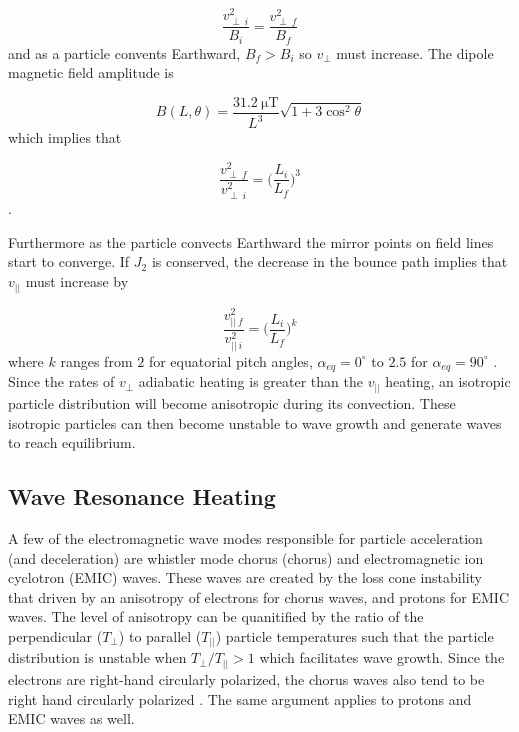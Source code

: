 \begin{equation}
\frac{v^2_{\perp \ i}}{B_i} = \frac{v^2_{\perp \ f}}{B_f}
\end{equation} and as a particle convents Earthward, $B_f > B_i$ so $v_\perp$ must increase. The dipole magnetic field amplitude is 

\begin{equation}
B(L, \theta) = \frac{31.2 \ \mathrm{\mu T}}{L^3}\sqrt{1 + 3 \cos^2 \theta}
\end{equation} which implies that 

\begin{equation}
\frac{v_{\perp \ f}^2}{v_{\perp \ i}^2} = \bigg( \frac{L_i}{L_f} \bigg)^3
\end{equation}.

Furthermore as the particle convects Earthward the mirror points on field lines start to converge. If $J_2$ is conserved, the decrease in the bounce path implies that $v_{||}$ must increase by 

\begin{equation}
\frac{v_{|| \ f}^2}{v_{|| \ i}^2} = \bigg( \frac{L_i}{L_f} \bigg)^k
\end{equation} where $k$ ranges from $2$ for equatorial pitch angles, $\alpha_{eq} = 0^\circ$ to $2.5$ for $\alpha_{eq} = 90^\circ$ \citep{Baumjohann1997}. Since the rates of $v_\perp$ adiabatic heating is greater than the $v_{||}$ heating, an isotropic particle distribution will become anisotropic during its convection. These isotropic particles can then become unstable to wave growth and generate waves to reach equilibrium.


\subsection{Wave Resonance Heating}\label{Intro:wave_heating}
A few of the electromagnetic wave modes responsible for particle acceleration (and deceleration) are whistler mode chorus (chorus) and electromagnetic ion cyclotron (EMIC) waves. These waves are created by the loss cone instability that driven by an anisotropy of electrons for chorus waves, and protons for EMIC waves. The level of anisotropy can be quanitified by the ratio of the perpendicular ($T_\perp$) to parallel ($T_{||}$) particle temperatures such that the particle distribution is unstable when $T_\perp/T_{||} > 1$ which facilitates wave growth. Since the electrons are right-hand circularly polarized, the chorus waves also tend to be right hand circularly polarized \citep{Tsurutani1997}. The same argument applies to protons and EMIC waves as well. 

